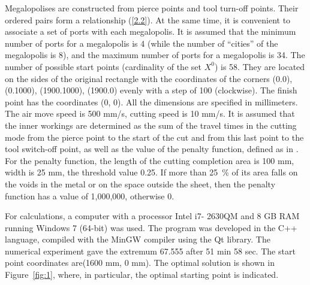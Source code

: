 \documentclass[numbers,sort&compress]{IntechOpen-Book}%
\begin{document}
Megalopolises are constructed from pierce points and tool turn-off points.
Their ordered pairs form a relationship (\ref{2.2}).
At the same time,
it is convenient to associate a set of ports with each megalopolis.
It is assumed that the minimum number of ports for a megalopolis is 4
(while the number of ``cities'' of the megalopolis is 8),
and the maximum number of ports for a megalopolis is 34.
The number of possible start points
(cardinality of the set $ X ^ 0 $)
is 58.
They are located on the sides of the original rectangle
with the coordinates of the corners
(0.0), (0.1000), (1900.1000), (1900.0)
evenly with a step of 100
(clockwise).
The finish point has the coordinates (0, 0).
All the dimensions are specified in millimeters.
The air move speed is 500 mm/s,
cutting speed is 10 mm/s.
It is assumed that the inner workings are determined
as the sum of the travel times in the cutting mode
from the pierce point to the start of the cut
and from this last point to
the tool switch-off point,
as well as the value of the penalty function,
defined as in
\cite{18}.
For the penalty function,
the length of the cutting completion area is 100 mm,
width is 25 mm,
the threshold value 0.25.
If more than 25~\% of its area
falls on the voids in the metal or on the space outside the sheet,
then the penalty function has a value of 1,000,000, otherwise 0.

For calculations, a computer with a processor Intel i7-
2630QM and 8 GB RAM running Windows 7 (64-bit) was used.
The program was developed in the C++ language,
compiled with the MinGW compiler using the Qt library.
The numerical experiment gave the extremum 67.555
after
51 min 58 sec.
The start point coordinates
are(1600 mm, 0 mm).
The optimal solution is shown in Figure~\ref{fig:1},
where, in particular, the optimal starting point is indicated.

\begin{figure}
  \centering
\end{figure}
\end{document}
